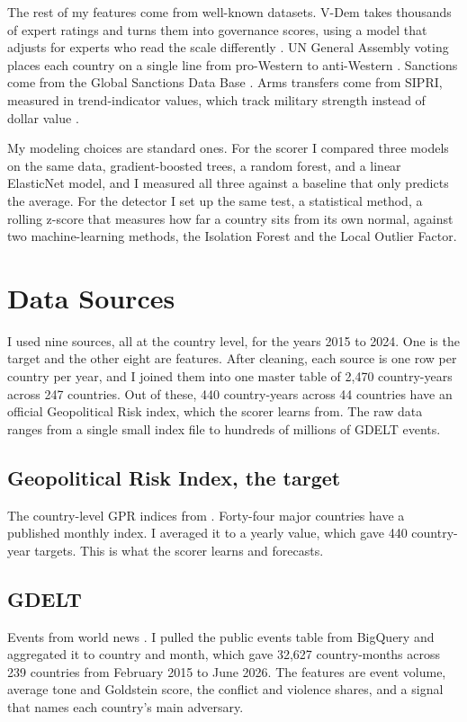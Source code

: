 \documentclass[stu,12pt,floatsintext]{apa7}
\begin{document}
The rest of my features come from well-known datasets. V-Dem takes thousands of expert ratings and turns them into governance scores, using a model that adjusts for experts who read the scale differently \cite{pemstein2025}. UN General Assembly voting places each country on a single line from pro-Western to anti-Western \cite{bailey2017}. Sanctions come from the Global Sanctions Data Base \cite{felbermayr2020}. Arms transfers come from SIPRI, measured in trend-indicator values, which track military strength instead of dollar value \cite{holtom2012}.

My modeling choices are standard ones. For the scorer I compared three models on the same data, gradient-boosted trees, a random forest, and a linear ElasticNet model, and I measured all three against a baseline that only predicts the average. For the detector I set up the same test, a statistical method, a rolling z-score that measures how far a country sits from its own normal, against two machine-learning methods, the Isolation Forest and the Local Outlier Factor.

\section{Data Sources}
I used nine sources, all at the country level, for the years 2015 to 2024. One is the target and the other eight are features. After cleaning, each source is one row per country per year, and I joined them into one master table of 2,470 country-years across 247 countries. Out of these, 440 country-years across 44 countries have an official Geopolitical Risk index, which the scorer learns from. The raw data ranges from a single small index file to hundreds of millions of GDELT events.

\subsection{Geopolitical Risk Index, the target}
The country-level GPR indices from . Forty-four major countries have a published monthly index. I averaged it to a yearly value, which gave 440 country-year targets. This is what the scorer learns and forecasts.

\subsection{GDELT}
Events from world news \cite{leetaru2013}. I pulled the public events table from BigQuery and aggregated it to country and month, which gave 32,627 country-months across 239 countries from February 2015 to June 2026. The features are event volume, average tone and Goldstein score, the conflict and violence shares, and a signal that names each country's main adversary.
\end{document}
